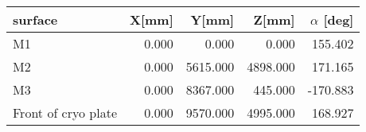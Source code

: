 \begin{tabular}{lrrrr}
\toprule
            surface &  X[mm] &    Y[mm] &    Z[mm] &  $\alpha$ [deg] \\
\midrule
              M1 &  0.000 &    0.000 &    0.000 &      155.402 \\
             M2 &  0.000 & 5615.000 & 4898.000 &      171.165 \\
               M3 &  0.000 & 8367.000 &  445.000 &     -170.883 \\
Front of cryo plate &  0.000 & 9570.000 & 4995.000 &      168.927 \\
\bottomrule
\end{tabular}
